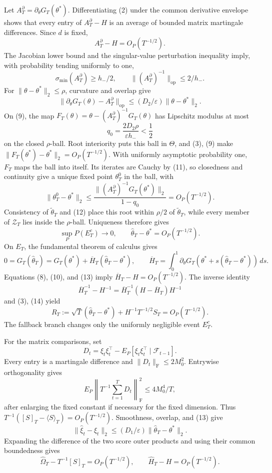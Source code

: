 Let \(A_T^\partial=\partial_\theta G_T(\theta^*)\).  Differentiating (2)
under the common derivative envelope shows that every entry of
\(A_T^\partial-H\) is an average of bounded matrix martingale differences.
Since \(d\) is fixed,
\[
 A_T^\partial-H=O_P(T^{-1/2}).
\tag{8}
\]
The Jacobian lower bound and the singular-value perturbation inequality imply,
with probability tending uniformly to one,
\[
 \sigma_{\min}(A_T^\partial)\ge h_-/2,
 \qquad \|(A_T^\partial)^{-1}\|_{\mathrm{op}}\le2/h_-.
\tag{9}
\]
For \(\|\theta-\theta^*\|_2\le\rho\), curvature and overlap give
\[
 \|\partial_\theta G_T(\theta)-A_T^\partial\|_{\mathrm{op}}
 \le(D_2/\varepsilon)\|\theta-\theta^*\|_2.
\tag{10}
\]
On (9), the map
\(F_T(\theta)=\theta-(A_T^\partial)^{-1}G_T(\theta)\) has Lipschitz
modulus at most
\[
 q_0=\frac{2D_2\rho}{\varepsilon h_-}<\frac12
\tag{11}
\]
on the closed \(\rho\)-ball.  Root interiority puts this ball in \(\Theta\),
and (3), (9) make
\(\|F_T(\theta^*)-\theta^*\|_2=O_P(T^{-1/2})\).  With uniformly asymptotic
probability one, \(F_T\) maps the ball into itself.  Its iterates are Cauchy
by (11), so closedness and continuity give a unique fixed point
\(\theta_T^0\) in the ball, with
\[
 \|\theta_T^0-\theta^*\|_2
 \le\frac{\|(A_T^\partial)^{-1}G_T(\theta^*)\|_2}{1-q_0}
 =O_P(T^{-1/2}).
\tag{12}
\]
Consistency of \(\widetilde\theta_T\) and (12) place this root within
\(\rho/2\) of \(\widetilde\theta_T\), while every member of \(\mathcal Z_T\)
lies inside the \(\rho\)-ball.  Uniqueness therefore gives
\[
 \sup_P P(E_T^c)\longrightarrow0,
 \qquad \widehat\theta_T-\theta^*=O_P(T^{-1/2}).
\tag{13}
\]
On \(E_T\), the fundamental theorem of calculus gives
\[
 0=G_T(\widehat\theta_T)=G_T(\theta^*)+\overline H_T
 (\widehat\theta_T-\theta^*),
 \qquad
 \overline H_T=\int_0^1\partial_\theta G_T
 (\theta^*+s(\widehat\theta_T-\theta^*))\,ds.
\tag{14}
\]
Equations (8), (10), and (13) imply
\(\overline H_T-H=O_P(T^{-1/2})\).  The inverse identity
\[
 \overline H_T^{-1}-H^{-1}
 =\overline H_T^{-1}(H-\overline H_T)H^{-1}
\tag{15}
\]
and (3), (14) yield
\[
 R_T:=\sqrt T(\widehat\theta_T-\theta^*)
 +H^{-1}T^{-1/2}S_T=O_P(T^{-1/2}).
\tag{16}
\]
The fallback branch changes only the uniformly negligible event \(E_T^c\).

For the matrix comparisons, set
\[
 D_t=\xi_t\xi_t^\top-E_P[\xi_t\xi_t^\top\mid\mathcal F_{t-1}].
\tag{17}
\]
Every entry is a martingale difference and
\(\|D_t\|_{\mathrm F}\le2M_0^2\).  Entrywise orthogonality gives
\[
 E_P\left\|T^{-1}\sum_{t=1}^TD_t\right\|_{\mathrm F}^2
 \le4M_0^4/T,
\tag{18}
\]
after enlarging the fixed constant if necessary for the fixed dimension.
Thus \(T^{-1}([S]_T-\langle S\rangle_T)=O_P(T^{-1/2})\).  Smoothness,
overlap, and (13) give
\[
 \|\widehat\xi_t-\xi_t\|_2
 \le(D_1/\varepsilon)\|\widehat\theta_T-\theta^*\|_2.
\tag{19}
\]
Expanding the difference of the two score outer products and using their
common boundedness gives
\[
 \widehat\Omega_T-T^{-1}[S]_T=O_P(T^{-1/2}),
 \qquad \widehat H_T-H=O_P(T^{-1/2}).
\tag{20}
\]


